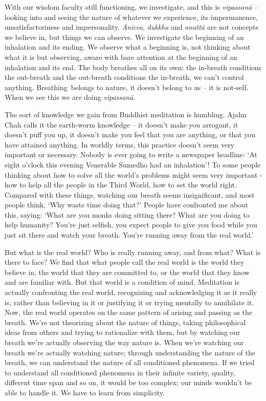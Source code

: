 With our wisdom faculty still functioning, we investigate, and this is \textit{vipassan\=a} -- looking into and seeing the nature of whatever we experience, its impermanence, unsatisfactoriness and impersonality. \textit{Anicca}, \textit{dukkha} and \textit{anatt\=a} are not concepts we believe in, but things we can observe. We investigate the beginning of an inhalation and its ending. We observe what a beginning is, not thinking about what it is but observing, aware with bare attention at the beginning of an inhalation and its end. The body breathes all on its own: the in-breath conditions the out-breath and the out-breath conditions the in-breath, we can't control anything. \mbox{Breathing belongs} to nature, it doesn't belong to us -- it is not-self. When we see this we are doing \textit{vipassan\=a}.

The sort of knowledge we gain from Buddhist meditation is humbling. Ajahn Chah calls it the earth-worm knowledge -- it doesn't make you arrogant, it doesn't puff you up, it doesn't make you feel that you are anything, or that you have attained anything. In worldly terms, this practice doesn't seem very important or necessary. Nobody is ever going to write a newspaper headline: `At eight o'clock this evening Venerable Sumedho had an inhalation'! To some people thinking about how to solve all the world's problems might seem very important - how to help all the people in the Third World, how to set the world right. Compared with these things, watching our breath seems insignificant, and most people think, `Why waste time doing that?' People have confronted me about this, saying: `What are you monks doing sitting there? What are you doing to help humanity? You're just selfish, you expect people to give you food while you just sit there and watch your breath. You're running away from the real world.'

But what is the real world? Who is really running away, and from what? What is there to face? We find that what people call the real world is the world they believe in, the world that they are committed to, or the world that they know and are familiar with. But that world is a condition of mind. Meditation is actually confronting the real world, recognizing and acknowledging it as it really is, rather than believing in it or justifying it or trying mentally to annihilate it. Now, the real world operates on the same pattern of arising and passing as the breath. We're not theorizing about the nature of things, taking philosophical ideas from others and trying to rationalize with them, but by watching our breath we're actually observing the way nature is. When we're watching our breath we're actually watching nature; through understanding the nature of the breath, we can understand the nature of all conditioned phenomena. If we tried to understand all conditioned phenomena in their infinite variety, quality, different time span and so on, it would be too complex; our minds wouldn't be able to handle it. We have to learn from simplicity.  

